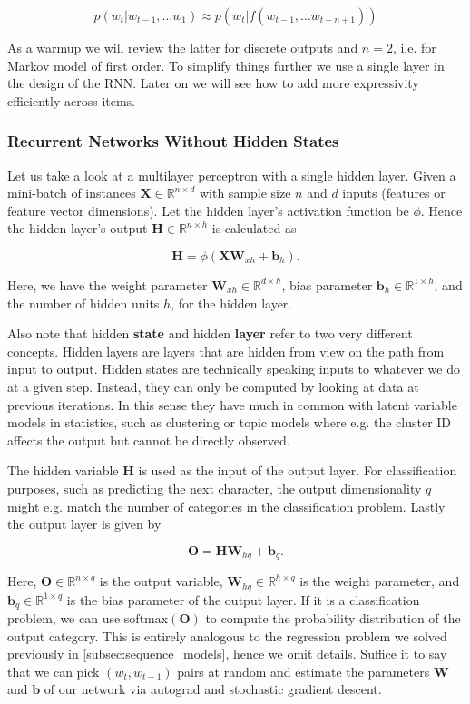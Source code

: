 $$p(w_t|w_{t-1}, \ldots w_1) \approx p(w_t|f(w_{t-1}, \ldots w_{t-n+1}))$$

As a warmup we will review the latter for discrete outputs and $n=2$, i.e. for Markov model of first order. To simplify things further we use a single layer in the design of the RNN. Later on we will see how to add more expressivity efficiently across items.

\subsubsection{Recurrent Networks Without Hidden States}

Let us take a look at a multilayer perceptron with a single hidden layer. Given a mini-batch of instances $\mathbf{X} \in \mathbb{R}^{n \times d}$ with sample size $n$ and $d$ inputs (features or feature vector dimensions). Let the hidden layer's activation function be $\phi$. Hence the hidden layer's output $\mathbf{H} \in \mathbb{R}^{n \times h}$ is calculated as

$$\mathbf{H} = \phi(\mathbf{X} \mathbf{W}_{xh} + \mathbf{b}_h).$$

Here, we have the weight parameter $\mathbf{W}_{xh} \in \mathbb{R}^{d \times h}$, bias parameter $\mathbf{b}_h \in \mathbb{R}^{1 \times h}$, and the number of hidden units $h$, for the hidden layer. 

Also note that hidden \textbf{state} and hidden \textbf{layer} refer to two very different concepts. Hidden layers are layers that are hidden from view on the path from input to output. Hidden states are technically speaking inputs to whatever we do at a given step. Instead, they can only be computed by looking at data at previous iterations. In this sense they have much in common with latent variable models in statistics, such as clustering or topic models where e.g. the cluster ID affects the output but cannot be directly observed.

The hidden variable $\mathbf{H}$ is used as the input of the output layer. For classification purposes, such as predicting the next character, the output dimensionality $q$ might e.g. match the number of categories in the classification problem. Lastly the output layer is given by

$$\mathbf{O} = \mathbf{H} \mathbf{W}_{hq} + \mathbf{b}_q.$$

Here, $\mathbf{O} \in \mathbb{R}^{n \times q}$ is the output variable, $\mathbf{W}_{hq} \in \mathbb{R}^{h \times q}$ is the weight parameter, and $\mathbf{b}_q \in \mathbb{R}^{1 \times q}$ is the bias parameter of the output layer.  If it is a classification problem, we can use $\text{softmax}(\mathbf{O})$ to compute the probability distribution of the output category. This is entirely analogous to the regression problem we solved previously in \cref{subsec:sequence_models}, hence we omit details. Suffice it to say that we can pick $(w_t, w_{t-1})$ pairs at random and estimate the parameters $\mathbf{W}$ and $\mathbf{b}$ of our network via autograd and stochastic gradient descent.

